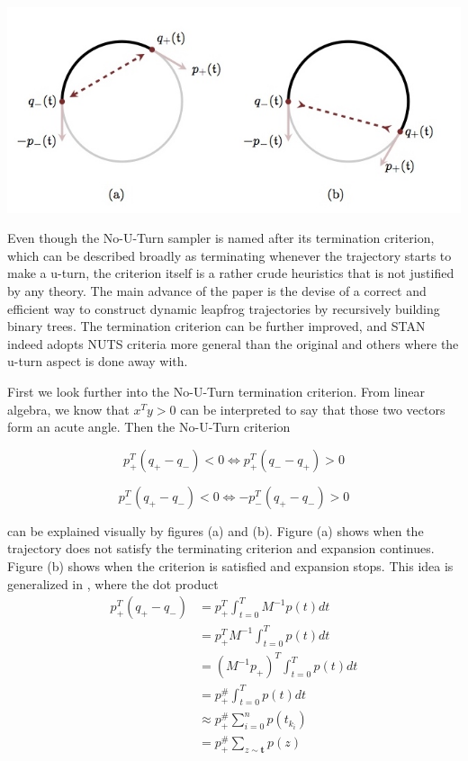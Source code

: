 \documentclass[]{report}
\begin{document}
\includegraphics[scale=0.5]{cropped_nuts_image}

Even though the No-U-Turn sampler is named after its termination criterion, which can be described broadly as terminating whenever the trajectory starts to make a u-turn, the criterion itself is a rather crude heuristics that is not justified by any theory. The main advance of the paper is the devise of a correct and efficient way to construct dynamic leapfrog trajectories by recursively building binary trees. The termination criterion can be further improved, and STAN indeed adopts NUTS criteria more general than the original and others where the u-turn aspect is done away with. 

First we look further into the No-U-Turn termination criterion. From linear algebra, we know that $x^Ty > 0 $ can be interpreted to say that those two vectors form an acute angle. Then the No-U-Turn criterion 

\[p_{+}^T (q_+ -q_-) < 0 \Leftrightarrow p_+^T (q_- - q_+) > 0 \]

\[p_{-}^T (q_+ -q_-) < 0 \Leftrightarrow -p_-^T (q_+ - q_-) > 0 \]

can be explained visually by figures (a) and (b). Figure (a) shows when the trajectory does not satisfy the terminating criterion and expansion continues. Figure (b) shows when the criterion is satisfied and expansion stops. This idea is generalized in \cite{betancourt2013generalizing}, where the dot product 
\begin{align*}
 p_{+}^T (q_{+} -q_{-})  
 &=p_{+}^T \int_{t=0}^{T} M^{-1}p(t) dt   \\
 &=p_{+}^T M^{-1} \int_{t=0}^{T} p(t)dt \\
 &=(M^{-1} p_{+})^T  \int_{t=0}^{T} p(t)dt \\
 &= p^{\#}_{+}  \int_{t=0}^{T} p(t)dt \\
 &\approx p^{\#}_{+} \sum_{i=0}^n p(t_{k_i}) \\
 &=  p^{\#}_{+} \sum_{z \sim \mathbf{t}} p(z) \\
\end{align*}
 
\end{document}
